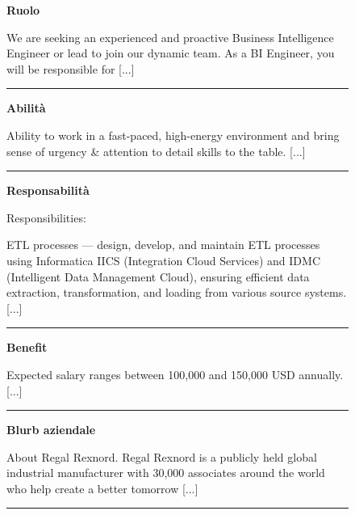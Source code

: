 \begin{figure}[H]
    \centering
    \scriptsize
\begin{minipage}[t]{0.47\textwidth}
    \raggedright
    \textbf{\textcolor{roleColor}{Ruolo}}\par
    We are seeking an experienced and proactive Business Intelligence Engineer or lead to join our dynamic team. As a BI Engineer, you will be responsible for [...]\par
    {\color{roleColor}\rule{\linewidth}{0.6pt}}\par\medskip

    \textbf{\textcolor{skillColor}{Abilità}}\par
    Ability to work in a fast-paced, high-energy environment and bring sense of urgency \& attention to detail skills to the table. [...] \par
    {\color{skillColor}\rule{\linewidth}{0.6pt}}\par\medskip

    \textbf{\textcolor{responsibilityColor}{Responsabilità}}\par
    Responsibilities:\par\smallskip
    ETL processes — design, develop, and maintain ETL processes using Informatica IICS (Integration Cloud Services) and IDMC (Intelligent Data Management Cloud), ensuring efficient data extraction, transformation, and loading from various source systems. [...]\par
    {\color{responsibilityColor}\rule{\linewidth}{0.6pt}}\par\medskip

    \textbf{\textcolor{benefitColor}{Benefit}}\par
    Expected salary ranges between 100,000 and 150,000 USD annually. [...]\par
    {\color{benefitColor}\rule{\linewidth}{0.6pt}}\par\medskip
\end{minipage}
\hfill
\begin{minipage}[t]{0.47\textwidth}
    \raggedright
    \textbf{\textcolor{companyBlurbColor}{Blurb aziendale}}\par
    About Regal Rexnord. Regal Rexnord is a publicly held global industrial manufacturer with 30,000 associates around the world who help create a better tomorrow [...]\par
    {\color{companyBlurbColor}\rule{\linewidth}{0.6pt}}\par\medskip


\end{minipage}
\end{figure}
